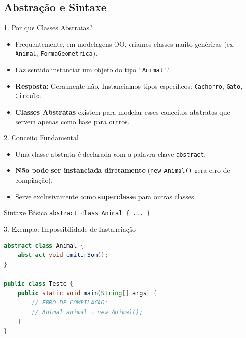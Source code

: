 \documentclass[9pt]{beamer}
\begin{document}
\subsection{Abstração e Sintaxe}
\begin{frame}{1. Por que Classes Abstratas?}
    \begin{itemize}
        \item Frequentemente, em modelagens OO, criamos classes muito genéricas (ex: \texttt{Animal}, \texttt{FormaGeometrica}).
        \item Faz sentido instanciar um objeto do tipo \texttt{"Animal"}? 
        \item \textbf{Resposta:} Geralmente não. Instanciamos tipos específicos: \texttt{Cachorro}, \texttt{Gato}, \texttt{Circulo}.
        \item \textbf{Classes Abstratas} existem para modelar esses conceitos abstratos que servem apenas como base para outros.
    \end{itemize}
\end{frame}

\begin{frame}{2. Conceito Fundamental}
    \begin{itemize}
        \item Uma classe abstrata é declarada com a palavra-chave \texttt{abstract}.
        \item \textbf{Não pode ser instanciada diretamente} (\texttt{new Animal()} gera erro de compilação).
        \item Serve exclusivamente como \textbf{superclasse} para outras classes.
    \end{itemize}
    \begin{block}{Sintaxe Básica}
        \texttt{abstract class Animal \{ ... \}}
    \end{block}
\end{frame}

\begin{frame}[fragile]{3. Exemplo: Impossibilidade de Instanciação}
\begin{lstlisting}[language=Java, caption=Tentativa de instanciar classe abstrata]
abstract class Animal {
    abstract void emitirSom();
}

public class Teste {
    public static void main(String[] args) {
        // ERRO DE COMPILACAO: 
        // Animal animal = new Animal(); 
    }
}
\end{lstlisting}
\end{frame}
\end{document}
